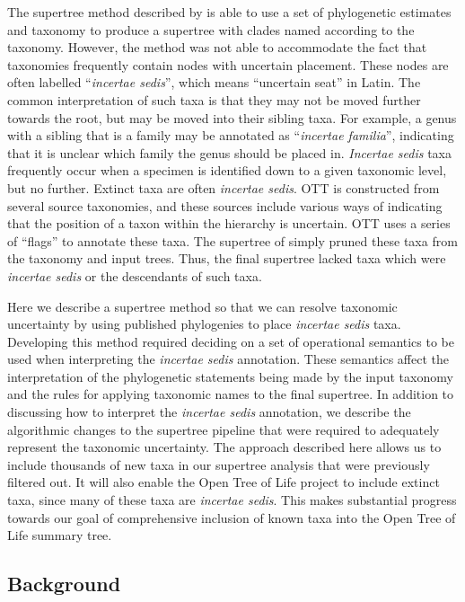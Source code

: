 \documentclass[english]{article}
\begin{document}
The supertree method described by \citet{redelings2017supertree} is able to use
a set of phylogenetic estimates and taxonomy to produce a supertree with clades
named according to the taxonomy. However, the method was not able to accommodate
the fact that taxonomies frequently contain nodes with uncertain placement.
These nodes are often labelled ``\emph{incertae sedis}'', which means
``uncertain seat'' in Latin. The common interpretation of such taxa is that
they may not be moved further towards the root, but may be moved into their
sibling taxa. For example, a genus with a sibling that is a family may be
annotated as ``\emph{incertae familia}'', indicating that it is unclear which
family the genus should be placed in. \emph{Incertae sedis} taxa frequently
occur when a specimen is identified down to a given taxonomic level, but no
further. Extinct taxa are often \emph{incertae sedis}. OTT is constructed from
several source taxonomies, and these sources include various ways of indicating
that the position of a taxon within the hierarchy is uncertain. OTT uses a
series of ``flags'' to annotate these taxa. The supertree of
\citet{redelings2017supertree} simply pruned these taxa from the taxonomy and
input trees. Thus, the final supertree lacked taxa which were \emph{incertae
sedis} or the descendants of such taxa.

Here we describe a supertree method so that we can resolve taxonomic uncertainty
by using published phylogenies to place \emph{incertae sedis} taxa. Developing
this method required deciding on a set of operational semantics to be used when
interpreting the \emph{incertae sedis} annotation. These semantics affect the
interpretation of the phylogenetic statements being made by the input taxonomy
and the rules for applying taxonomic names to the final supertree. In addition
to discussing how to interpret the \emph{incertae sedis} annotation, we describe
the algorithmic changes to the supertree pipeline that were required to
adequately represent the taxonomic uncertainty. The approach described here
allows us to include thousands of new taxa in our supertree analysis that were
previously filtered out. It will also enable the Open Tree of Life project to
include extinct taxa, since many of these taxa are \emph{incertae sedis}. This
makes substantial progress towards our goal of comprehensive inclusion of known
taxa into the Open Tree of Life summary tree.

\subsection{Background}
\label{sec:background}
\end{document}
